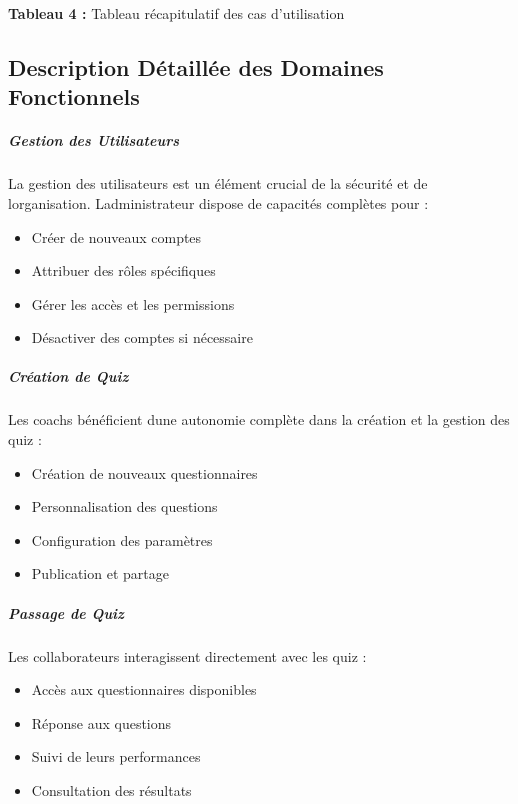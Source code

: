 \documentclass[12pt,a4paper,twoside]{report}
\begin{document}
\begin{center}
\textbf{Tableau 4 :} Tableau récapitulatif des cas d'utilisation
\end{center}

\hypertarget{description-duxe9tailluxe9e-des-domaines-fonctionnels}{%
\subsection{Description Détaillée des Domaines
Fonctionnels}\label{description-duxe9tailluxe9e-des-domaines-fonctionnels}}

\hypertarget{gestion-des-utilisateurs-1}{%
\subparagraph{\texorpdfstring{ Gestion des
Utilisateurs}{ Gestion des Utilisateurs}}\label{gestion-des-utilisateurs-1}}

La gestion des utilisateurs est un élément crucial de la sécurité et de
l\textquotesingle organisation. L\textquotesingle administrateur dispose
de capacités complètes pour :

\begin{itemize}
\item
  Créer de nouveaux comptes
\item
  Attribuer des rôles spécifiques
\item
  Gérer les accès et les permissions
\item
  Désactiver des comptes si nécessaire
\end{itemize}

\hypertarget{cruxe9ation-de-quiz}{%
\subparagraph{\texorpdfstring{ Création de
Quiz}{ Création de Quiz}}\label{cruxe9ation-de-quiz}}

Les coachs bénéficient d\textquotesingle une autonomie complète dans la
création et la gestion des quiz :

\begin{itemize}
\item
  Création de nouveaux questionnaires
\item
  Personnalisation des questions
\item
  Configuration des paramètres
\item
  Publication et partage
\end{itemize}

\hypertarget{passage-de-quiz}{%
\subparagraph{Passage de Quiz}\label{passage-de-quiz}}

Les collaborateurs interagissent directement avec les quiz :

\begin{itemize}
\item
  Accès aux questionnaires disponibles
\item
  Réponse aux questions
\item
  Suivi de leurs performances
\item
  Consultation des résultats
\end{itemize}
\end{document}
